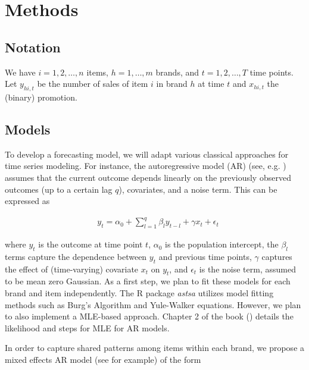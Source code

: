 \documentclass{article}
\begin{document}
\vspace{1cm}

\section{Methods}

\subsection*{Notation}
\noindent{}We have $i = 1, 2, \dots, n$ items, $h = 1, \dots , m$ brands, and $t = 1, 2, \dots, T$ time points. Let $y_{hi,t}$ be the number of sales of item $i$ in brand $h$ at time $t$ and $x_{hi,t}$ the (binary) promotion.

\subsection*{Models}

\noindent To develop a forecasting model, we will adapt various classical approaches for time series modeling. For instance, the autoregressive model (AR) (see, e.g. \cite{box2015time}) assumes that the current outcome depends linearly on the previously observed outcomes (up to a certain lag $q$), covariates, and a noise term. This can be expressed as

\begin{align}
    & y_t = \alpha_0+\sum_{l=1}^q \beta_l y_{t-l} + \gamma x_{t} + \epsilon_{t}
    \label{eq:model1}
\end{align}

\noindent where $y_t$ is the outcome at time point $t$, $\alpha_0$ is the population intercept, the $\beta_l$ terms capture the dependence between $y_t$ and previous time points, $\gamma$ captures the effect of (time-varying) covariate $x_t$ on $y_t$, and $\epsilon_t$ is the noise term, assumed to be mean zero Gaussian. As a first step, we plan to fit these models for each brand and item independently. The R package {\it astsa} utilizes model fitting methods such as Burg's Algorithm and Yule-Walker equations. However, we plan to also implement a MLE-based approach. Chapter 2 of the book (\cite{funatogawa2018longitudinal}) details the likelihood and steps for MLE for AR models.

\noindent In order to capture shared patterns among items within each brand, we propose a mixed effects AR model (see \cite{nicholls2012random} for example) of the form
\end{document}
